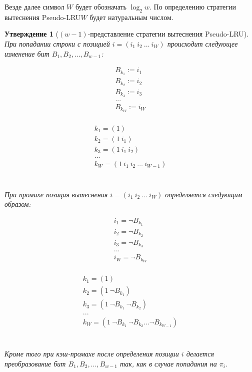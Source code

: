 \documentclass[14pt]{extreport}
\newtheorem{utv}{Утверждение}
\newcommand{\PseudoLRU}{\textsf{Pseudo-LRU}\xspace}
\begin{document}
Везде далее символ $W$ будет обозначать $\log_2 w$. По определению
стратегии вытеснения \PseudoLRU $W$ будет натуральным числом.

\begin{utv}[$(w{-}1)$-представление стратегии вытеснения
\PseudoLRU]\label{wMinus1PseudoLRU}При попадании строки с позицией
$i = (i_1~i_2~\dots~i_W)$ происходит следующее изменение бит $B_1,
B_2, ..., B_{w{-}1}$:

\parbox{0.3\textwidth}{
  $$ \begin{array}{l}
  B_{k_1} := i_1 \\
  B_{k_2} := i_2 \\
  B_{k_3} := i_3 \\
  ...\\
  B_{k_W} := i_W \\
  \end{array}$$
} \vline
\parbox{0.7\textwidth}{
  $$ \begin{array}{l}
  k_1 = (1) \\
  k_2 = (1~i_1) \\
  k_3 = (1~i_1~i_2) \\
  ...\\
  k_W = (1~i_1~i_2~\dots~i_{W{-}1}) \\
  \end{array} $$
}
\\[1cm]

При промахе позиция вытеснения $i = (i_1~i_2~\dots~i_W)$ определяется
следующим образом:

\parbox{0.3\textwidth}{
  $$ \begin{array}{l}
  i_1 = \neg B_{k_1} \\
  i_2 = \neg B_{k_2} \\
  i_3 = \neg B_{k_3} \\
  ...\\
  i_W = \neg B_{k_W} \\
  \end{array}$$
} \vline
\parbox{0.7\textwidth}{
  $$ \begin{array}{l}
  k_1 = (1) \\
  k_2 = (1~\neg B_{k_1}) \\
  k_3 = (1~\neg B_{k_1}~\neg B_{k_2}) \\
  ...\\
  k_W = (1~\neg B_{k_1}~\neg B_{k_2}\dots\neg B_{k_{W{-}1}}) \\
  \end{array} $$
}
\\[0.5cm]

Кроме того при кэш-промахе после определения позиции $i$ делается
преобразование бит $B_1, B_2, ..., B_{w{-}1}$ так, как в случае
попадания на $\pi_i$.
\end{utv}
\end{document}

